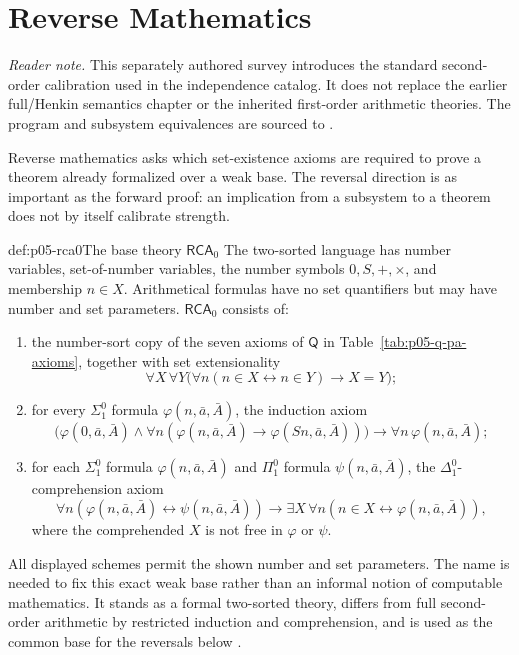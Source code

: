 \chapter{Reverse Mathematics}\label{sec:p05-reverse-mathematics}

\noindent\textit{Reader note.}  This separately authored survey introduces the
standard second-order calibration used in the independence catalog.  It does
not replace the earlier full/Henkin semantics chapter or the inherited
first-order arithmetic theories.  The program and subsystem equivalences are
sourced to \cite{Friedman1975,Simpson2009}.

Reverse mathematics asks which set-existence axioms are required to prove a
theorem already formalized over a weak base. The reversal direction is as
important as the forward proof: an implication from a subsystem to a theorem
does not by itself calibrate strength.

\begin{hbdefinition}{def:p05-rca0}{The base theory \(\mathsf{RCA}_0\)}
The two-sorted language has number variables, set-of-number variables, the
number symbols \(0,S,+,\times\), and membership \(n\in X\).  Arithmetical
formulas have no set quantifiers but may have number and set parameters.
\(\mathsf{RCA}_0\) consists of:
\begin{enumerate}
  \item the number-sort copy of the seven axioms of \(\mathsf Q\) in
        Table~\ref{tab:p05-q-pa-axioms}, together with set extensionality
        \[
        \forall X\,\forall Y
        \bigl(\forall n(n\in X\leftrightarrow n\in Y)\to X=Y\bigr);
        \]
  \item for every \(\Sigma^0_1\) formula \(\varphi(n,\bar a,\bar A)\), the
        induction axiom
        \[
        \bigl(\varphi(0,\bar a,\bar A)\land
        \forall n(\varphi(n,\bar a,\bar A)\to
                    \varphi(Sn,\bar a,\bar A))\bigr)
        \to\forall n\,\varphi(n,\bar a,\bar A);
        \]
  \item for each \(\Sigma^0_1\) formula
        \(\varphi(n,\bar a,\bar A)\) and \(\Pi^0_1\) formula
        \(\psi(n,\bar a,\bar A)\), the \(\Delta^0_1\)-comprehension axiom
        \[
        \forall n(\varphi(n,\bar a,\bar A)\leftrightarrow
                   \psi(n,\bar a,\bar A))
        \to
        \exists X\,\forall n
          (n\in X\leftrightarrow\varphi(n,\bar a,\bar A)),
        \]
        where the comprehended \(X\) is not free in \(\varphi\) or \(\psi\).
\end{enumerate}
All displayed schemes permit the shown number and set parameters.  The name
is needed to fix this exact weak base rather than an informal notion of
computable mathematics.  It stands as a formal two-sorted theory, differs from
full second-order arithmetic by restricted induction and comprehension, and
is used as the common base for the reversals below \cite{Simpson2009}.
\end{hbdefinition}

